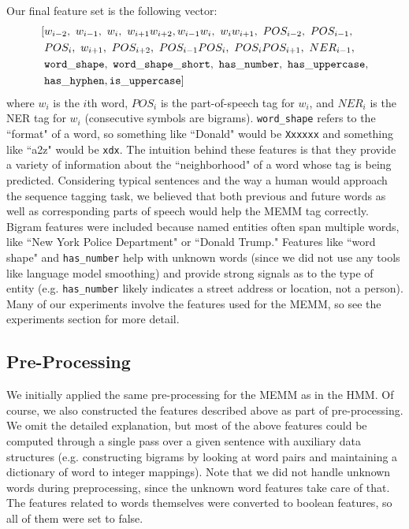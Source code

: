 \documentclass[12pt]{article}
\begin{document}
\begin{itemize}
Our final feature set is the following vector:
\begin{equation*}
\begin{split}
[&w_{i - 2},\ w_{i - 1},\ w_i,\ w_{i + 1}w_{i + 2},
w_{i - 1}w_i,\ w_iw_{i + 1},\ POS_{i - 2},\ POS_{i - 1},\\
&POS_i,\ w_{i + 1},\ POS_{i + 2}, \ POS_{i - 1}POS_i,\ POS_iPOS_{i + 1},\ NER_{i - 1},\\
&{\tt word\_shape,\ word\_shape\_short,\ has\_number,\ has\_uppercase,}\\
&{\tt has\_hyphen, is\_uppercase}
]
\end{split}
\end{equation*}
where $w_i$ is the $i$th word, $POS_i$ is the part-of-speech tag for $w_i$, and $NER_i$ is the NER tag for $w_i$ (consecutive symbols are bigrams). {\tt word\_shape} refers to the ``format" of a word, so something like ``Donald" would be {\tt Xxxxxx} and something like ``a2z" would be {\tt xdx}.
The intuition behind these features is that they provide a variety of information about the ``neighborhood" of a word whose tag is being predicted. Considering typical sentences and the way a human would approach the sequence tagging task, we believed that both previous and future words as well as corresponding parts of speech would help the MEMM tag correctly. Bigram features were included because named entities often span multiple words, like ``New York Police Department" or ``Donald Trump." Features like ``word shape" and {\tt has\_number} help with unknown words (since we did not use any tools like language model smoothing) and provide strong signals as to the type of entity (e.g. {\tt has\_number} likely indicates a street address or location, not a person). Many of our experiments involve the features used for the MEMM, so see the experiments section for more detail.
\end{itemize}
\subsection{Pre-Processing}
We initially applied the same pre-processing for the MEMM as in the HMM. Of course, we also constructed the features described above as part of pre-processing. We omit the detailed explanation, but most of the above features could be computed through a single pass over a given sentence with auxiliary data structures (e.g. constructing bigrams by looking at word pairs and maintaining a dictionary of word to integer mappings). Note that we did not handle unknown words during preprocessing, since the unknown word features take care of that. The features related to words themselves were converted to boolean features, so all of them were set to false.
\end{document}
